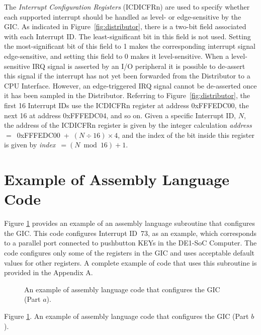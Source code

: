 \documentclass[11pt, twoside, pdftex]{article}
\begin{document}
The {\it Interrupt Configuration Registers} (ICDICFRn) are used to specify whether each
supported interrupt should be handled as level- or edge-sensitive by the GIC. As indicated in
Figure~\ref{fig:distributor}, there is a two-bit field associated with each Interrupt ID.
The least-significant bit in this field is not used.  Setting the most-significant bit
of this field to 1 makes the corresponding interrupt signal edge-sensitive, and setting
this field to 0 makes it level-sensitive. When a level-sensitive IRQ signal is asserted by
an I/O peripheral it is possible to de-assert this signal if the interrupt has not yet
been forwarded from the Distributor to a CPU Interface. However, an edge-triggered IRQ 
signal cannot be de-asserted once it has been sampled in the Distributor.
Referring to Figure~\ref{fig:distributor}, the first 16 Interrupt IDs use the ICDICFRn
register at address {\sf 0xFFFEDC00}, the next 16 at address {\sf 0xFFFEDC04}, and so on. 
Given a specific Interrupt ID, $N$, the address of the ICDICFRn register 
is given by the integer calculation 
{\it address}~$=$~{\sf 0xFFFEDC00}~+~$(N \div 16) \times 4$, and 
the index of the bit inside this register is given by {\it index}~$= (N \bmod 16)+1$.

\newpage
\section{Example of Assembly Language Code}
\label{sec:ass_code}Figure \ref{fig:ass_code} provides an example of an assembly language
subroutine that configures the GIC. This code configures Interrupt ID~73, as an example, which
corresponds to a parallel port connected to pushbutton KEYs in the DE1-SoC Computer. The code
configures only some of the registers in the GIC and uses acceptable default values for
other registers. A complete example of code that uses this subroutine is provided in the
Appendix A.

\begin{figure}[h!]
\begin{center}

\end{center}
\caption{An example of assembly language code that configures the GIC (Part $a$).}
   \label{fig:ass_code}
\end{figure}

\clearpage
\begin{center}

Figure \ref{fig:ass_code}. An example of assembly language code that configures the GIC (Part $b$).
\end{center}
\end{document}
